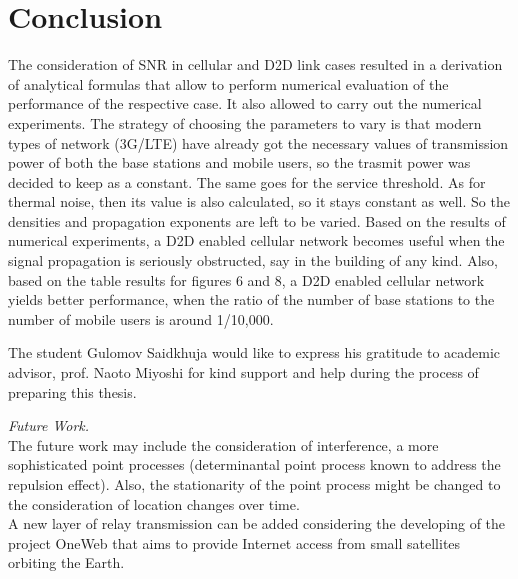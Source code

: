 \section{Conclusion}
The consideration of SNR in cellular and D2D link cases resulted in a derivation of analytical formulas that allow to perform numerical evaluation of the performance of the respective case. It also allowed to carry out the numerical experiments. The strategy of choosing the parameters to vary is that modern types of network (3G/LTE) have already got the necessary values of transmission power of both the base stations and mobile users, so the trasmit power was decided to keep as a constant. The same goes for the service threshold. As for thermal noise, then its value is also calculated, so it stays constant as well. So the densities and propagation exponents are left to be varied.
Based on the results of numerical experiments, a D2D enabled cellular network becomes useful when the signal propagation is seriously obstructed, say in the building of any kind. Also, based on the table results for figures 6 and 8, a D2D enabled cellular network yields better performance, when the ratio of the number of base stations to the number of mobile users is around 1/10,000.
\par The student Gulomov Saidkhuja would like to express his gratitude to academic advisor, prof. Naoto Miyoshi for kind support and help during the process of preparing this thesis. 
\par {\it Future Work.}
\\The future work may include the consideration of interference, a more sophisticated point processes (determinantal point process known to address the repulsion effect).
Also, the stationarity of the point process might be changed to the consideration of location changes over time.
\\A new layer of relay transmission can be added considering the developing of the project OneWeb that aims to provide Internet access from small satellites orbiting the Earth.
